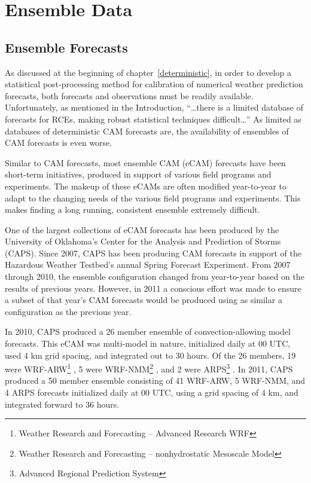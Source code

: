 

\section{Ensemble Data}
\label{edata}




\subsection{Ensemble Forecasts}
\label{emodel}

As discussed at the beginning of \mbox{chapter \ref{deterministic}}, in order to develop a statistical post-processing method for calibration of numerical weather prediction forecasts, both forecasts and observations must be readily available.
Unfortunately, as mentioned in the Introduction, ``\dots there is a limited database of forecasts for RCEs, making robust statistical techniques difficult\dots''
As limited as databases of deterministic CAM forecasts are, the availability of ensembles of CAM forecasts is even worse.


Similar to CAM forecasts, most ensemble CAM (eCAM) forecasts have been short-term initiatives, produced in support of various field programs and experiments.
The makeup of these eCAMs are often modified year-to-year to adapt to the changing needs of the various field programs and experiments.
This makes finding a long running, consistent ensemble extremely difficult.


One of the largest collections of eCAM forecasts has been produced by the University of Oklahoma's Center for the Analysis and Prediction of Storms (CAPS).
Since 2007, CAPS has been producing CAM forecasts in support of the Hazardous Weather Testbed's annual Spring Forecast Experiment.
From 2007 through 2010, the ensemble configuration changed from year-to-year based on the results of previous years.
However, in 2011 a conscious effort was made to ensure a subset of that year's CAM forecasts would be produced using as similar a configuration as the previous year.


In 2010, CAPS produced a 26 member ensemble of convection-allowing model forecasts.
This eCAM was multi-model in nature, initialized daily at 00 UTC, used 4 km grid spacing, and integrated out to 30 hours.
Of the 26 members, 19 were WRF-ARW\footnote{Weather Research and Forecasting -- Advanced Research WRF} \citep{WRFV3}, 5 were WRF-NMM\footnote{Weather Research and Forecasting -- nonhydrostatic Mesoscale Model} \citep{NAMnWRF-NMM}, and 2 were ARPS\footnote{Advanced Regional Prediction System} \citep{ARPS}. In 2011, CAPS produced a 50 member ensemble consisting of 41 WRF-ARW, 5 WRF-NMM, and 4 ARPS forecasts initialized daily at 00 UTC, using a grid spacing of 4 km, and integrated forward to 36 hours.


